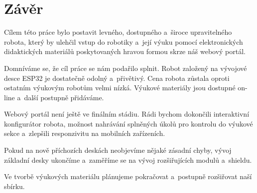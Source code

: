 \chapter*{Závěr}
Cílem této práce bylo postavit levného, dostupného a~široce upravitelného robota, který by ulehčil vstup do robotiky a~její výuku pomocí elektronických didaktických materiálů poskytovaných hravou formou skrze náš webový portál.

Domníváme se, že cíl práce se nám podařilo splnit. Robot založený na vývojové desce ESP32 je dostatečně odolný a~přivětivý. Cena robota zůstala oproti ostatním výukovým robotům velmi nízká. Výukové materiály jsou dostupné on-line a~další postupně přidáváme.

Webový portál není ještě ve finálním stádiu. Rádi bychom dokončili interaktivní konfigurátor robota, možnost nahrávání splněných úkolů pro kontrolu do výukové sekce a~zlepšili responzivitu na mobilních zařízeních.

Pokud na nově příchozích deskách neobjevíme nějaké zásadní chyby, vývoj základní desky ukončíme a~zaměříme se na vývoj rozšiřujících modulů a~shieldu.

Ve tvorbě výukových materiálu plánujeme pokračovat a~postupně rozšiřovat naší sbírku.